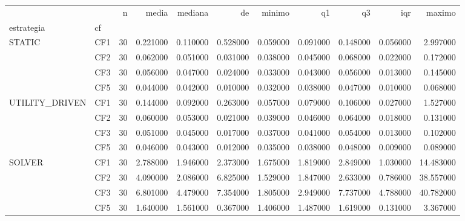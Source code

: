 \begin{tabular}{llrrrrrrrrr}
\toprule
 &  & n & media & mediana & de & minimo & q1 & q3 & iqr & maximo \\
estrategia & cf &  &  &  &  &  &  &  &  &  \\
\midrule
\multirow[t]{4}{*}{STATIC} & CF1 & 30 & 0.221000 & 0.110000 & 0.528000 & 0.059000 & 0.091000 & 0.148000 & 0.056000 & 2.997000 \\
 & CF2 & 30 & 0.062000 & 0.051000 & 0.031000 & 0.038000 & 0.045000 & 0.068000 & 0.022000 & 0.172000 \\
 & CF3 & 30 & 0.056000 & 0.047000 & 0.024000 & 0.033000 & 0.043000 & 0.056000 & 0.013000 & 0.145000 \\
 & CF5 & 30 & 0.044000 & 0.042000 & 0.010000 & 0.032000 & 0.038000 & 0.047000 & 0.010000 & 0.068000 \\
\cline{1-11}
\multirow[t]{4}{*}{UTILITY_DRIVEN} & CF1 & 30 & 0.144000 & 0.092000 & 0.263000 & 0.057000 & 0.079000 & 0.106000 & 0.027000 & 1.527000 \\
 & CF2 & 30 & 0.060000 & 0.053000 & 0.021000 & 0.039000 & 0.046000 & 0.064000 & 0.018000 & 0.131000 \\
 & CF3 & 30 & 0.051000 & 0.045000 & 0.017000 & 0.037000 & 0.041000 & 0.054000 & 0.013000 & 0.102000 \\
 & CF5 & 30 & 0.046000 & 0.043000 & 0.012000 & 0.035000 & 0.038000 & 0.048000 & 0.009000 & 0.089000 \\
\cline{1-11}
\multirow[t]{4}{*}{SOLVER} & CF1 & 30 & 2.788000 & 1.946000 & 2.373000 & 1.675000 & 1.819000 & 2.849000 & 1.030000 & 14.483000 \\
 & CF2 & 30 & 4.090000 & 2.086000 & 6.825000 & 1.529000 & 1.847000 & 2.633000 & 0.786000 & 38.557000 \\
 & CF3 & 30 & 6.801000 & 4.479000 & 7.354000 & 1.805000 & 2.949000 & 7.737000 & 4.788000 & 40.782000 \\
 & CF5 & 30 & 1.640000 & 1.561000 & 0.367000 & 1.406000 & 1.487000 & 1.619000 & 0.131000 & 3.367000 \\
\cline{1-11}
\bottomrule
\end{tabular}
